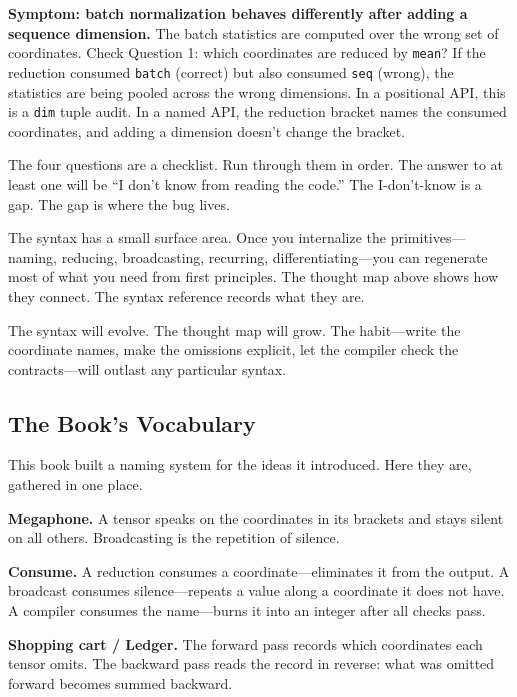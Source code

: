 \documentclass[11pt,titlepage]{article}
\begin{document}
\textbf{Symptom: batch normalization behaves differently after adding a
sequence dimension.} The batch statistics are computed over the wrong
set of coordinates. Check Question 1: which coordinates are reduced by
\texttt{mean}? If the reduction consumed \texttt{batch} (correct) but
also consumed \texttt{seq} (wrong), the statistics are being pooled
across the wrong dimensions. In a positional API, this is a \texttt{dim}
tuple audit. In a named API, the reduction bracket names the consumed
coordinates, and adding a dimension doesn't change the bracket.

The four questions are a checklist. Run through them in order. The
answer to at least one will be ``I don't know from reading the code.''
The I-don't-know is a gap. The gap is where the bug lives.

\vspace{2em}

The syntax has a small surface area. Once you internalize the
primitives---naming, reducing, broadcasting, recurring,
differentiating---you can regenerate most of what you need from first
principles. The thought map above shows how they connect. The syntax
reference records what they are.

The syntax will evolve. The thought map will grow. The habit---write the
coordinate names, make the omissions explicit, let the compiler check
the contracts---will outlast any particular syntax.

\vspace{2em}

\hypertarget{the-books-vocabulary}{%
\subsection{The Book's Vocabulary}\label{the-books-vocabulary}}

This book built a naming system for the ideas it introduced. Here they
are, gathered in one place.

\textbf{Megaphone.} A tensor speaks on the coordinates in its brackets
and stays silent on all others. Broadcasting is the repetition of
silence.

\textbf{Consume.} A reduction consumes a coordinate---eliminates it from
the output. A broadcast consumes silence---repeats a value along a
coordinate it does not have. A compiler consumes the name---burns it
into an integer after all checks pass.

\textbf{Shopping cart / Ledger.} The forward pass records which
coordinates each tensor omits. The backward pass reads the record in
reverse: what was omitted forward becomes summed backward.
\end{document}
